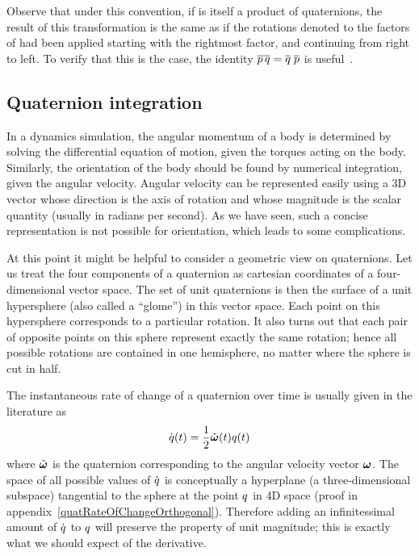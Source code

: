 Observe that under this convention, if  is itself a product of quaternions, the
result of this transformation is the same as if the rotations denoted to the factors
of  had been applied starting with the rightmost factor, and continuing from
right to left. To verify that this is the case, the identity
$\overline{\mbox{$p$}\, \mbox{$q$}} = \mbox{$\overline{q}$}\; \mbox{$\overline{p}$}$
is useful~\cite{MathWorld:Quaternion}.

\subsection{Quaternion integration}

In a dynamics simulation, the angular momentum of a body is determined by solving the
differential equation of motion, given the torques acting on the body. Similarly, the
orientation of the body should be found by numerical integration, given the angular
velocity. Angular velocity can be represented easily using a 3D vector whose
direction is the axis of rotation and whose magnitude is the scalar quantity (usually in
radians per second). As we have seen, such a concise representation is not possible for
orientation, which leads to some complications.

At this point it might be helpful to consider a geometric view on quaternions. Let us treat
the four components of a quaternion as cartesian coordinates of a four-dimensional vector
space. The set of unit quaternions is then the surface of a unit hypersphere (also called a
``glome''\cite{MathWorld:4D}) in this vector space. Each point on this hypersphere
corresponds to a particular rotation. It also turns out that each pair of
opposite points on this sphere represent exactly the same rotation; hence all possible
rotations are contained in one hemisphere, no matter where the sphere is cut in half.

The instantaneous rate of change of a quaternion  over time is usually given
in the literature as
\begin{equation}
\label{quatRateOfChange}
\dot{\q{q}}(t) = \frac{1}{2}\tilde{\ve{\omega}}(t)\q{q}(t)
\end{equation}
where $\tilde{\ve{\omega}}$ is the quaternion corresponding to the angular velocity
vector $\ve{\omega}$. The space of all possible values of $\dot{\mbox{$q$}}$ is
conceptually a hyperplane (a three-dimensional subspace) tangential to the sphere at the point
$\mbox{$q$}$ in 4D space (proof in appendix~\ref{quatRateOfChangeOrthogonal}). Therefore adding an
infinitessimal amount of $\dot{\mbox{$q$}}$ to $\mbox{$q$}$ will preserve the property of
unit magnitude; this is exactly what we should expect of the derivative.

